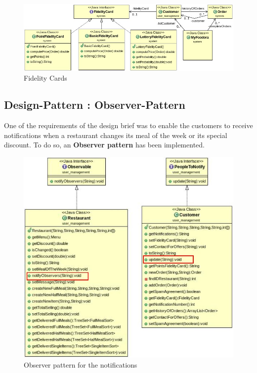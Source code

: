 \begin{figure}[H]
	\centering
	\includegraphics[width=1\linewidth]{./ima/fidelitycard.jpg}
	\caption{Fidelity Cards}
	\label{fig:fidelitycards}
\end{figure}

\subsection{Design-Pattern : Observer-Pattern}
\label{sub:designpattern_observer_pattern}
One of the requirements of the design brief was to enable the customers to receive notifications when a restaurant changes its meal of the week or its special discount. To do so, an \textbf{Observer pattern} has been implemented.

\begin{figure}[H]
	\centering
	\includegraphics[width=1\linewidth]{./ima/observerV2.jpg}
	\caption{Observer pattern for the notifications}
	\label{fig:./ima/observer}
\end{figure}

